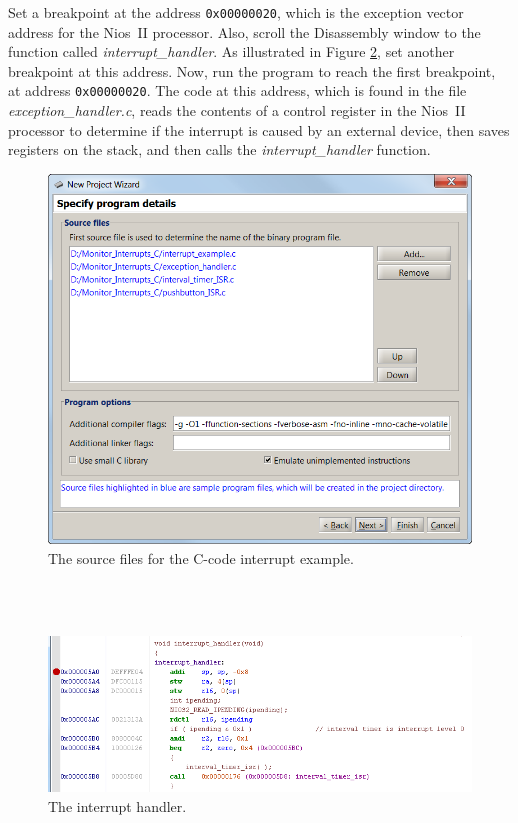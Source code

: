 \documentclass[11pt, twoside, pdftex]{article}
\begin{document}
Set a breakpoint at the address \texttt{0x00000020}, which is the
exception vector address for the Nios~II processor.  Also, scroll
the Disassembly window to the function called 
{\it interrupt\_handler}. As illustrated in Figure \ref{fig:AMP_interrupts_interrupthandler_nios}, set
another breakpoint at this address. Now, run the program to reach
the first breakpoint, at address \texttt{0x00000020}. 
The code at this address, which is found in the file
{\it exception\_handler.c}, reads the contents of a control
register in the Nios~II processor to determine if the interrupt
is caused by an external device, then saves registers on the
stack, and then calls the {\it interrupt\_handler} function.

\newpage
\begin{figure}[H]
   \begin{center}
      \includegraphics[scale=1]{screenshots/figure53.png}
   \end{center}
   \caption{The source files for the C-code interrupt example.} 
   \label{fig:NPW_interrupts_c_sourcefiles_nios}
\end{figure}

~\\
~\\
\begin{figure}[H]
   \begin{center}
      \includegraphics[scale=1]{screenshots/figure54.png}
   \end{center}
   \caption{The interrupt handler.} 
   \label{fig:AMP_interrupts_interrupthandler_nios}
\end{figure}
\end{document}
